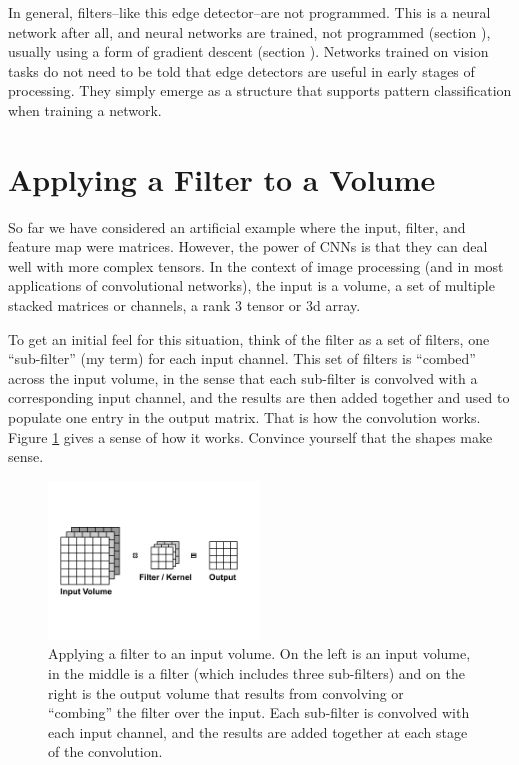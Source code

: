 In general, filters--like this edge detector--are not programmed. This is a neural network after all, and neural networks are trained, not programmed (section ), usually using a form of gradient descent (section ). Networks trained on vision tasks do not need to be told that edge detectors are useful in early stages of processing. They simply emerge as a structure that supports pattern classification when training a network.

\section{Applying a Filter to a Volume}

So far we have considered an artificial example where the input, filter, and feature map were matrices. However, the power of CNNs is that they can deal well with more complex tensors. In the context of image processing (and in most applications of convolutional networks), the input is a volume, a set of multiple stacked matrices or channels, a rank 3 tensor or 3d array. 

To get an initial feel for this situation, think of the filter as a set of filters, one ``sub-filter'' (my term) for each input channel. This set of filters is ``combed'' across the input volume, in the sense that each sub-filter is convolved with a corresponding input channel, and the results are then added together and used to populate one entry in the output matrix. That is how the convolution works. Figure \ref{filterComb} gives a sense of how it works. Convince yourself that the shapes make sense.

\begin{figure}
\centering
\includegraphics[width=0.5\textwidth]{images/filterComb.png}
\caption[Soraya Boza.]{Applying a filter to an input volume. On the left is an input volume, in the middle is a filter (which includes three sub-filters) and on the right is the output volume that results from convolving or ``combing'' the filter over the input. Each sub-filter is convolved with each input channel, and the results are added together at each stage of the convolution. }
\label{filterComb}
\end{figure}

